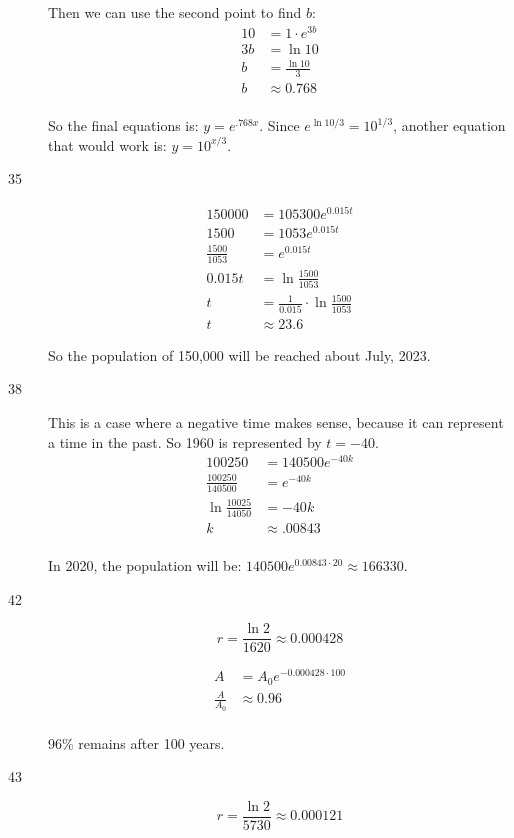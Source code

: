 \documentclass[fleqn,addpoints]{exam}
\begin{document}
\begin{description}
Then we can use the second point to find $b$:
\begin{align*}
  10 &= 1 \cdot e^{3b} \\ 
  3b &= \ln 10 \\ 
  b &= \frac{\ln 10}{3} \\ 
  b &\approx 0.768 \\
\end{align*}

So the final equations is: $y = e^{.768x}$.  Since $e^{\ln 10/3} = 10^{1/3}$, another equation that would work is:
$y = 10^{x/3}$.

\item[35]
\begin{align*}
  150000 &= 105300 e^{0.015t} \\
  1500 &= 1053 e^{0.015t} \\
  \frac{1500}{1053} &=  e^{0.015t} \\
  0.015t &= \ln \frac{1500}{1053} \\
  t &= \frac{1}{0.015} \cdot \ln \frac{1500}{1053} \\
  t &\approx 23.6
\end{align*}

So the population of 150,000 will be reached about July, 2023.

\item[38]
This is a case where a negative time makes sense, because it can represent a time in the past.  So 1960 is represented by $t = -40$.
\begin{align*}
  100250 &= 140500 e^{-40k} \\
  \frac{100250}{140500} &= e^{-40k} \\
  \ln \frac{10025}{14050} &= -40k \\
  k &\approx .00843 \\
\end{align*}

In 2020, the population will be: $140500 e^{0.00843 \cdot 20} \approx 166330$.

\item[42]
\[
  r = \frac{\ln 2}{1620} \approx 0.000428
\]

\begin{align*}
  A &= A_0 e^{-0.000428 \cdot 100} \\
  \frac{A}{A_0} &\approx 0.96 \\
\end{align*}

96\% remains after 100 years.

\item[43]
\[
  r = \frac{\ln 2}{5730} \approx 0.000121
\]


\end{description}
\end{document}
